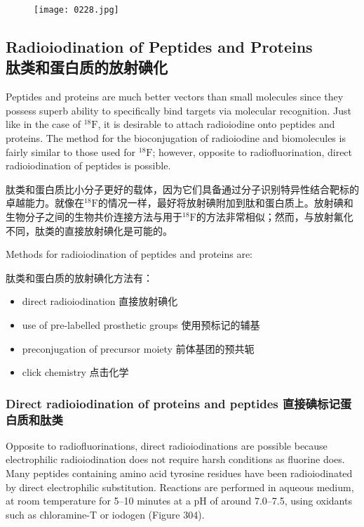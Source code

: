 \documentclass[dvipsnames, svgnames,a4paper,11pt]{article}
\begin{document}
\begin{figure}[h]
	\centering
    \texttt{[image: 0228.jpg]}  
     \label{fig303}
\end{figure}


\subsection{Radioiodination of Peptides and Proteins\\ 肽类和蛋白质的放射碘化}  
Peptides and proteins are much better vectors than small molecules since they possess superb ability to specifically bind targets via molecular recognition. Just like in the case of \(\mathrm{^{18}F}\), it is desirable to attach radioiodine onto peptides and proteins. The method for the bioconjugation of radioiodine and biomolecules is fairly similar to those used for \(\mathrm{^{18}F}\); however, opposite to radiofluorination, direct radioiodination of peptides is possible.

肽类和蛋白质比小分子更好的载体，因为它们具备通过分子识别特异性结合靶标的卓越能力。就像在\(\mathrm{^{18}F}\)的情况一样，最好将放射碘附加到肽和蛋白质上。放射碘和生物分子之间的生物共价连接方法与用于\(\mathrm{^{18}F}\)的方法非常相似；然而，与放射氟化不同，肽类的直接放射碘化是可能的。

Methods for radioiodination of peptides and proteins are:  

肽类和蛋白质的放射碘化方法有：  

\begin{itemize}
  \item direct radioiodination 直接放射碘化
  \item use of pre-labelled prosthetic groups 使用预标记的辅基
  \item preconjugation of precursor moiety 前体基团的预共轭
  \item click chemistry 点击化学
\end{itemize}

\subsubsection{Direct radioiodination of proteins and peptides 直接碘标记蛋白质和肽类}  
Opposite to radiofluorinations, direct radioiodinations are possible because electrophilic radioiodination does not require harsh conditions as fluorine does. Many peptides containing amino acid tyrosine residues have been radioiodinated by direct electrophilic substitution. Reactions are performed in aqueous medium, at room temperature for 5–10 minutes at a pH of around 7.0–7.5, using oxidants such as chloramine-T or iodogen (Figure 304).  
\end{document}
